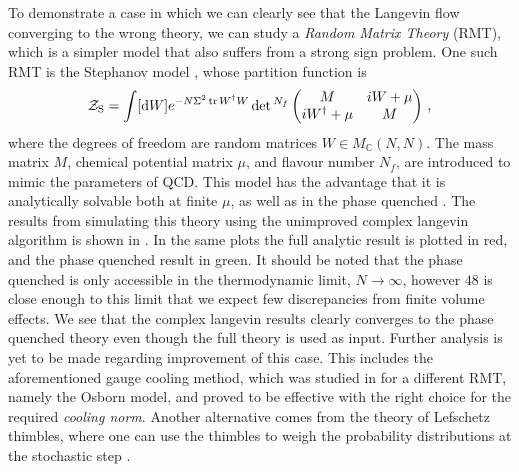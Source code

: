 To demonstrate a case in which we can clearly see that the Langevin flow
converging to the wrong theory, we can study a \emph{Random Matrix Theory}
(RMT), which is a simpler model that also suffers from a strong sign problem.
One such RMT is the Stephanov model \citep{Stephanov:1996ki}, whose partition
function is
%
\begin{equation}
  \mathcal{Z}_{\mathrm{S}} = \int [\mathrm{d} W] e^{-N \Sigma^2 \operatorname{tr} W^{\dagger} W}
    \det{}^{N_f} 
      \begin{pmatrix}
        M & i W + \mu \\
        i W^{\dagger} + \mu & M
      \end{pmatrix} \,,
\end{equation}
%
where the degrees of freedom are random matrices $W \in M_{\mathbb{C}}(N,N)$.
The mass matrix $M$, chemical potential matrix $\mu$, and flavour number $N_f$,
are introduced to mimic the parameters of QCD. This model has the advantage that
it is analytically solvable both at finite $\mu$, as well as in the phase
quenched \citep{Stephanov:1996ki,Halasz:1997he}. The results from simulating
this theory using the unimproved complex langevin algorithm is shown in
. In the same plots the full analytic result is plotted in
red, and the phase quenched result in green. It should be noted that the phase
quenched is only accessible in the thermodynamic limit, $N \to \infty$, however
$48$ is close enough to this limit that we expect few discrepancies from finite
volume effects. We see that the complex langevin results clearly converges to
the phase quenched theory even though the full theory is used as input. Further
analysis is yet to be made regarding improvement of this case. This includes the
aforementioned gauge cooling method, which was studied in
\citep{Nagata:2016alq,Nagata:2016vkn} for a different RMT, namely
the Osborn model, and proved to be effective with the right choice for the
required \emph{cooling norm}. Another alternative comes from the theory of
Lefschetz thimbles, where one can use the thimbles to weigh the probability
distributions at the stochastic step \citep{DiRenzo:2015foa}.

